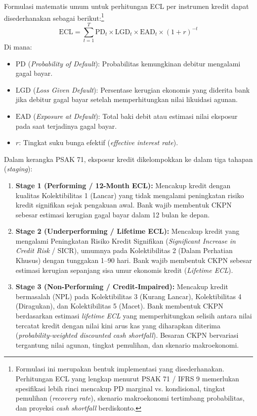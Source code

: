 \documentclass[12pt,a4paper]{article}
\numberwithin{equation}{section}
\begin{document}
\noindent
Formulasi matematis umum untuk perhitungan ECL per instrumen kredit dapat disederhanakan sebagai berikut:\footnote{Formulasi ini merupakan bentuk implementasi yang disederhanakan. Perhitungan ECL yang lengkap menurut PSAK 71 / IFRS 9 memerlukan spesifikasi lebih rinci mencakup PD marginal vs. kondisional, tingkat pemulihan (\emph{recovery rate}), skenario makroekonomi tertimbang probabilitas, dan proyeksi \emph{cash shortfall} berdiskonto.}
\begin{equation}
  \text{ECL} = \sum_{t=1}^T \text{PD}_t \times \text{LGD}_t \times \text{EAD}_t \times (1 + r)^{-t}
\end{equation}
Di mana:
\begin{itemize}
  \item $\text{PD}$ (\emph{Probability of Default}): Probabilitas kemungkinan debitur mengalami gagal bayar.
  \item $\text{LGD}$ (\emph{Loss Given Default}): Persentase kerugian ekonomis yang diderita bank jika debitur gagal bayar setelah memperhitungkan nilai likuidasi agunan.
  \item $\text{EAD}$ (\emph{Exposure at Default}): Total baki debit atau estimasi nilai eksposur pada saat terjadinya gagal bayar.
  \item $r$: Tingkat suku bunga efektif (\emph{effective interest rate}).
\end{itemize}

\noindent
Dalam kerangka PSAK 71, eksposur kredit dikelompokkan ke dalam tiga tahapan (\emph{staging}):
\begin{enumerate}
  \item \textbf{Stage 1 (Performing / 12-Month ECL):} Mencakup kredit dengan kualitas Kolektibilitas 1 (Lancar) yang tidak mengalami peningkatan risiko kredit signifikan sejak pengakuan awal. Bank wajib membentuk CKPN sebesar estimasi kerugian gagal bayar dalam 12 bulan ke depan.
  \item \textbf{Stage 2 (Underperforming / Lifetime ECL):} Mencakup kredit yang mengalami Peningkatan Risiko Kredit Signifikan (\emph{Significant Increase in Credit Risk} / SICR), umumnya pada Kolektibilitas 2 (Dalam Perhatian Khusus) dengan tunggakan 1--90 hari. Bank wajib membentuk CKPN sebesar estimasi kerugian sepanjang sisa umur ekonomis kredit (\emph{Lifetime ECL}).
  \item \textbf{Stage 3 (Non-Performing / Credit-Impaired):} Mencakup kredit bermasalah (NPL) pada Kolektibilitas 3 (Kurang Lancar), Kolektibilitas 4 (Diragukan), dan Kolektibilitas 5 (Macet). Bank membentuk CKPN berdasarkan estimasi \emph{lifetime ECL} yang memperhitungkan selisih antara nilai tercatat kredit dengan nilai kini arus kas yang diharapkan diterima (\emph{probability-weighted discounted cash shortfall}). Besaran CKPN bervariasi tergantung nilai agunan, tingkat pemulihan, dan skenario makroekonomi.
\end{enumerate}
\end{document}
